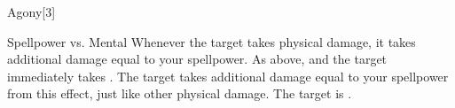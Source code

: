 \begin{spellsection}{Agony}[3]
    \begin{spellheader}
    \end{spellheader}
    \begin{spellcontent}
        \begin{spelltargetinginfo}
        \end{spelltargetinginfo}
        \begin{spelleffects}
            \begin{spellattack}{Spellpower vs. Mental}
                \spellsuccess Whenever the target takes physical damage, it takes additional damage equal to your spellpower.
                \spellcritical As above, and the target immediately takes . The target takes additional damage equal to your spellpower from this effect, just like other physical damage.
                \spellfailure The target is \sickened.
            \end{spellattack}
            \spelldur \durbrief
        \end{spelleffects}
    \end{spellcontent}
    \begin{spellfooter}
        \miscastrandom
    \end{spellfooter}
    \begin{spellaugments}
    \end{spellaugments}
\end{spellsection}

